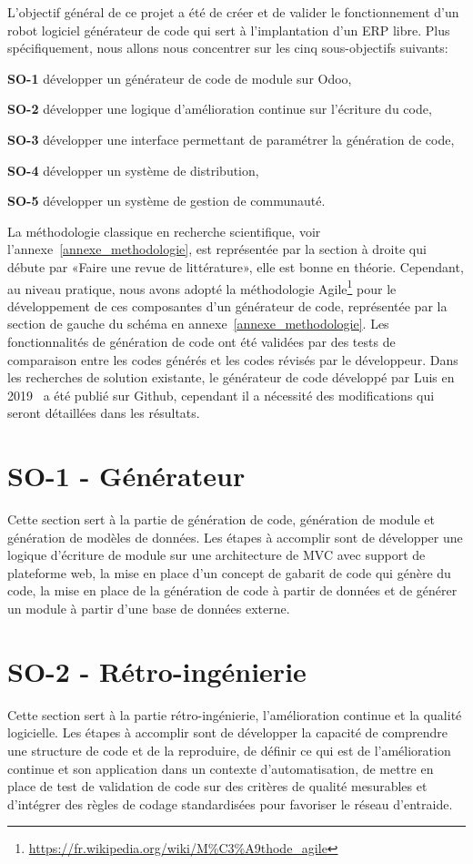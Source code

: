 \label{sec:Theme1} \label{chapitre_methode}
L’objectif général de ce projet a été de créer et de valider le fonctionnement d’un robot logiciel générateur de code qui sert à l’implantation d’un ERP libre. Plus spécifiquement, nous allons nous concentrer sur les cinq sous-objectifs suivants:

\textbf{SO-1} développer un générateur de code de module sur Odoo,

\textbf{SO-2} développer une logique d'amélioration continue sur l'écriture du code,

\textbf{SO-3} développer une interface permettant de paramétrer la génération de code,

\textbf{SO-4} développer un système de distribution,

\textbf{SO-5} développer un système de gestion de communauté.

La méthodologie classique en recherche scientifique, voir l'annexe~\ref{annexe_methodologie}, est représentée par la section à droite qui débute par «Faire une revue de littérature», elle est bonne en théorie. Cependant, au niveau pratique, nous avons adopté la méthodologie Agile\footnote{\url{https://fr.wikipedia.org/wiki/M\%C3\%A9thode_agile}} pour le développement de ces composantes d'un générateur de code, représentée par la section de gauche du schéma en annexe~\ref{annexe_methodologie}. Les fonctionnalités de génération de code ont été validées par des tests de comparaison entre les codes générés et les codes révisés par le développeur. Dans les recherches de solution existante, le générateur de code développé par Luis en 2019~\cite{bluiksnot_repo} a été publié sur Github, cependant il a nécessité des modifications qui seront détaillées dans les résultats. 

\section{SO-1 - Générateur}
Cette section sert à la partie de génération de code, génération de module et génération de modèles de données. Les étapes à accomplir sont de développer une logique d’écriture de module sur une architecture de MVC avec support de plateforme web, la mise en place d’un concept de gabarit de code qui génère du code, la mise en place de la génération de code à partir de données et de générer un module à partir d’une base de données externe.

\section{SO-2 - Rétro-ingénierie}
Cette section sert à la partie rétro-ingénierie, l'amélioration continue et la qualité logicielle. Les étapes à accomplir sont de développer la capacité de comprendre une structure de code et de la reproduire, de définir ce qui est de l’amélioration continue et son application dans un contexte d’automatisation, de mettre en place de test de validation de code sur des critères de qualité mesurables et d'intégrer des règles de codage standardisées pour favoriser le réseau d’entraide.

